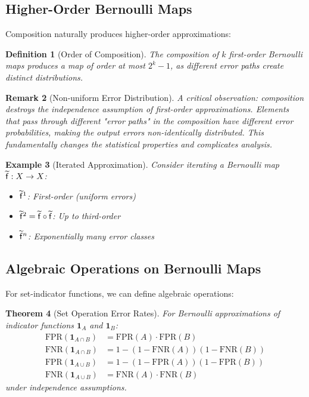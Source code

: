 \documentclass[11pt,final,hidelinks]{article}
\newtheorem{theorem}{Theorem}[section]
\newtheorem{definition}[theorem]{Definition}
\newtheorem{example}[theorem]{Example}
\newtheorem{remark}[theorem]{Remark}
\newcommand{\AFun}[1]{\obs{\mathsf{#1}}}  %
\newcommand{\Set}[1]{#1}              %
\newcommand{\compose}{\circ}
\newcommand{\SetIndicator}[1]{\mathbf{1}_{#1}}
\begin{document}
\subsection{Higher-Order Bernoulli Maps}

Composition naturally produces higher-order approximations:

\begin{definition}[Order of Composition]
The composition of $k$ first-order Bernoulli maps produces a map of order at most $2^k - 1$, as different error paths create distinct distributions.
\end{definition}

\begin{remark}[Non-uniform Error Distribution]
A critical observation: composition destroys the independence assumption of first-order approximations. Elements that pass through different "error paths" in the composition have different error probabilities, making the output errors non-identically distributed. This fundamentally changes the statistical properties and complicates analysis.
\end{remark}

\begin{example}[Iterated Approximation]
Consider iterating a Bernoulli map $\AFun{f}: \Set{X} \to \Set{X}$:
\begin{itemize}
    \item $\AFun{f}^1$: First-order (uniform errors)
    \item $\AFun{f}^2 = \AFun{f} \compose \AFun{f}$: Up to third-order
    \item $\AFun{f}^n$: Exponentially many error classes
\end{itemize}
\end{example}

\subsection{Algebraic Operations on Bernoulli Maps}

For set-indicator functions, we can define algebraic operations:

\begin{theorem}[Set Operation Error Rates]
For Bernoulli approximations of indicator functions $\SetIndicator{A}$ and $\SetIndicator{B}$:
\begin{align}
\text{FPR}(\SetIndicator{A \cap B}) &= \text{FPR}(A) \cdot \text{FPR}(B) \\
\text{FNR}(\SetIndicator{A \cap B}) &= 1 - (1-\text{FNR}(A))(1-\text{FNR}(B)) \\
\text{FPR}(\SetIndicator{A \cup B}) &= 1 - (1-\text{FPR}(A))(1-\text{FPR}(B)) \\
\text{FNR}(\SetIndicator{A \cup B}) &= \text{FNR}(A) \cdot \text{FNR}(B)
\end{align}
under independence assumptions.
\end{theorem}
\end{document}
